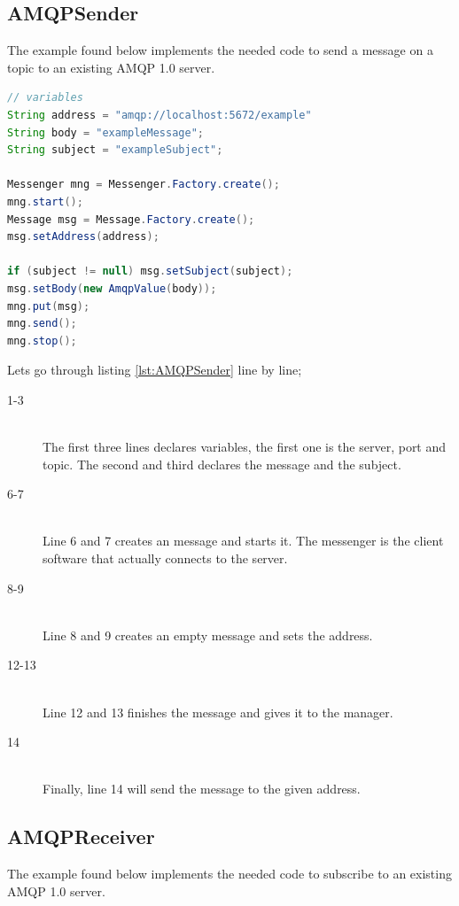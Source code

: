 \subsection{AMQPSender}
The example found below implements the needed code to send a message on a topic to an existing AMQP 1.0 server.

\begin{lstlisting}[language=Java, captionpos=b, caption=Example use of Messenger to subscribe, frame=bt, showstringspaces=false,label={lst:AMQPSender}]
// variables
String address = "amqp://localhost:5672/example"
String body = "exampleMessage";
String subject = "exampleSubject";

Messenger mng = Messenger.Factory.create();
mng.start();
Message msg = Message.Factory.create();
msg.setAddress(address);

if (subject != null) msg.setSubject(subject);
msg.setBody(new AmqpValue(body));
mng.put(msg);
mng.send();
mng.stop();
\end{lstlisting}

\noindent Lets go through listing \ref{lst:AMQPSender} line by line;

\begin{description}
\item[1-3] \hfill \\ The first three lines declares variables, the first one is the server, port and topic. The second and third declares the message and the subject.
\item[6-7] \hfill \\ Line 6 and 7 creates an message and starts it. The messenger is the client software that actually connects to the server.
\item[8-9] \hfill \\ Line 8 and 9 creates an empty message and sets the address.
\item[12-13] \hfill \\ Line 12 and 13 finishes the message and gives it to the manager.
\item[14] \hfill \\ Finally, line 14 will send the message to the given address.
\end{description}

\subsection{AMQPReceiver}
The example found below implements the needed code to subscribe to an existing AMQP 1.0 server.



